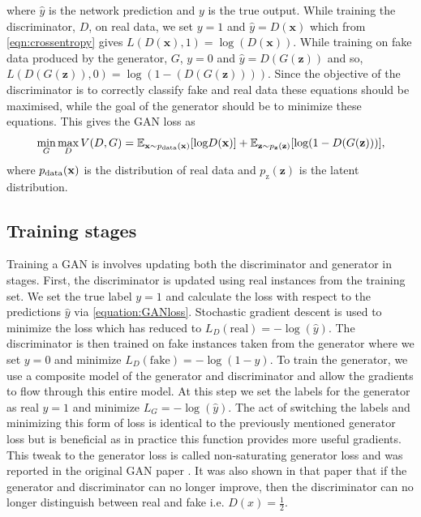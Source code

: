 \documentclass[12pt]{iopart}
\begin{document}
where $\hat{y}$ is the network prediction and $y$ is the true output. While training the discriminator, $D$, on real data, we set $y = 1$ and $\hat{y} = D(\mathbf{x})$ which from \cref{eqn:crossentropy} gives $L(D(\mathbf{x}),1) = \log(D(\mathbf{x}))$. While training on fake data produced by the generator, $G$, $y = 0$ and $\hat{y} = D(G(\mathbf{z}))$ and so, $L(D(G(\mathbf{z})),0) = \log(1-(D(G(\mathbf{z}))))$. Since the objective of the discriminator is to correctly classify fake and real data these equations should be maximised, while the goal of the generator should be to minimize these equations. This gives the \ac{GAN} loss as
%
\begin{equation}
   \mathop{\text{min}}_{G}  \mathop{\text{max}}_{D} V(D,G) = \mathbb{E}_{\mathbf{x} \sim p_{\text{\text{data}}}(\mathbf{x})} [\text{log} D(\mathbf{x})] + \mathbb{E}_{\mathbf{z} \sim p_{\mathbf{z}}(\mathbf{z})} [\text{log}(1-D(G(\mathbf{z})))],
 \label{equation:GANloss}
 \end{equation}
where $p_{\text{\text{data}}}(\mathbf{x})$ is the distribution of real data and $p_{\text{z}}(\mathbf{z})$ is the latent distribution. 

\subsection{Training stages}
%
Training a GAN is involves updating both the discriminator and generator in stages. First, the discriminator is updated using real instances from the training set. We set the true label $y=1$ and calculate the loss with respect to the predictions $\hat{y}$ via \cref{equation:GANloss}. Stochastic gradient descent is used to minimize the loss which has reduced to $L_D(\textrm{real}) = -\log(\hat{y})$. The discriminator is then trained on fake instances taken from the generator where we set $y=0$ and minimize $L_D(\textrm{fake}) = -\log(1-\hat{y})$. To train the generator, we use a composite model of the generator and discriminator and allow the gradients to flow through this entire model. At this step we set the labels for the generator as real $y=1$ and minimize $L_G = -\log(\hat{y})$. The act of switching the labels and minimizing this form of loss is identical to the previously mentioned generator loss but is beneficial as in practice this function provides more useful gradients. This tweak to the generator loss is called non-saturating generator loss and was reported in the original \ac{GAN} paper \cite{Goodfellow2014}. It was also shown in that paper that if the generator and discriminator can no longer improve, then the discriminator can no longer distinguish between real and fake i.e. $D(x) = \frac{1}{2}$. 
\end{document}
